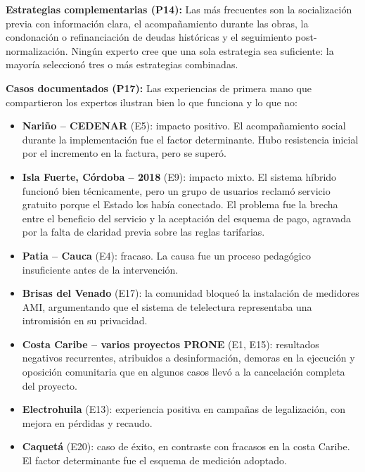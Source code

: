 \textbf{Estrategias complementarias (P14):} Las más frecuentes son la socialización previa con información clara, el acompañamiento durante las obras, la condonación o refinanciación de deudas históricas y el seguimiento post-normalización. Ningún experto cree que una sola estrategia sea suficiente: la mayoría seleccionó tres o más estrategias combinadas.

\textbf{Casos documentados (P17):} Las experiencias de primera mano que compartieron los expertos ilustran bien lo que funciona y lo que no:

\begin{itemize}
    \item \textbf{Nariño -- CEDENAR} (E5): impacto positivo. El acompañamiento social durante la implementación fue el factor determinante. Hubo resistencia inicial por el incremento en la factura, pero se superó.

    \item \textbf{Isla Fuerte, Córdoba -- 2018} (E9): impacto mixto. El sistema híbrido funcionó bien técnicamente, pero un grupo de usuarios reclamó servicio gratuito porque el Estado los había conectado. El problema fue la brecha entre el beneficio del servicio y la aceptación del esquema de pago, agravada por la falta de claridad previa sobre las reglas tarifarias.

    \item \textbf{Patia -- Cauca} (E4): fracaso. La causa fue un proceso pedagógico insuficiente antes de la intervención.

    \item \textbf{Brisas del Venado} (E17): la comunidad bloqueó la instalación de medidores AMI, argumentando que el sistema de telelectura representaba una intromisión en su privacidad.

    \item \textbf{Costa Caribe -- varios proyectos PRONE} (E1, E15): resultados negativos recurrentes, atribuidos a desinformación, demoras en la ejecución y oposición comunitaria que en algunos casos llevó a la cancelación completa del proyecto.

    \item \textbf{Electrohuila} (E13): experiencia positiva en campañas de legalización, con mejora en pérdidas y recaudo.

    \item \textbf{Caquetá} (E20): caso de éxito, en contraste con fracasos en la costa Caribe. El factor determinante fue el esquema de medición adoptado.
\end{itemize}

